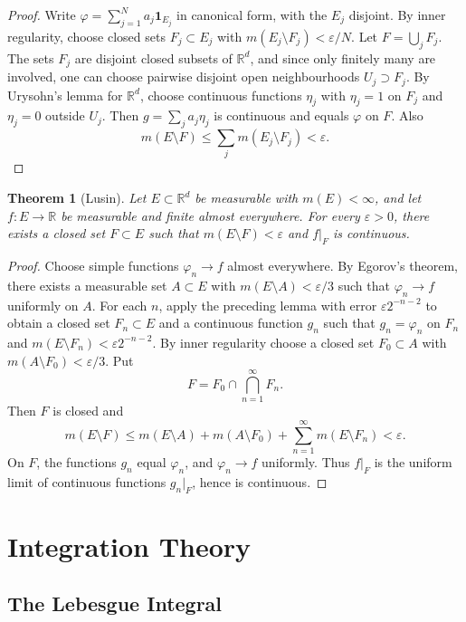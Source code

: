 \documentclass[11pt,openany]{book}
\numberwithin{equation}{chapter}
\theoremstyle{definition}
\theoremstyle{plain}
\newtheorem{theorem}[definition]{Theorem}
\theoremstyle{remark}
\newcommand{\R}{\mathbb{R}}
\newcommand{\eps}{\varepsilon}
\newcommand{\1}{\mathbf{1}}
\begin{document}
\begin{proof}
Write \(\varphi=\sum_{j=1}^N a_j\1_{E_j}\) in canonical form, with the \(E_j\) disjoint.  By inner regularity, choose closed sets \(F_j\subset E_j\) with \(m(E_j\setminus F_j)<\eps/N\).  Let \(F=\bigcup_jF_j\).  The sets \(F_j\) are disjoint closed subsets of \(\R^d\), and since only finitely many are involved, one can choose pairwise disjoint open neighbourhoods \(U_j\supset F_j\).  By Urysohn's lemma for \(\R^d\), choose continuous functions \(\eta_j\) with \(\eta_j=1\) on \(F_j\) and \(\eta_j=0\) outside \(U_j\).  Then \(g=\sum_ja_j\eta_j\) is continuous and equals \(\varphi\) on \(F\).  Also
\[
    m(E\setminus F)\le\sum_jm(E_j\setminus F_j)<\eps.
\]
\end{proof}

\begin{theorem}[Lusin]
Let \(E\subset\R^d\) be measurable with \(m(E)<\infty\), and let \(f:E\to\R\) be measurable and finite almost everywhere.  For every \(\eps>0\), there exists a closed set \(F\subset E\) such that \(m(E\setminus F)<\eps\) and \(f|_F\) is continuous.
\end{theorem}

\begin{proof}
Choose simple functions \(\varphi_n\to f\) almost everywhere.  By Egorov's theorem, there exists a measurable set \(A\subset E\) with \(m(E\setminus A)<\eps/3\) such that \(\varphi_n\to f\) uniformly on \(A\).  For each \(n\), apply the preceding lemma with error \(\eps 2^{-n-2}\) to obtain a closed set \(F_n\subset E\) and a continuous function \(g_n\) such that \(g_n=\varphi_n\) on \(F_n\) and \(m(E\setminus F_n)<\eps2^{-n-2}\).  By inner regularity choose a closed set \(F_0\subset A\) with \(m(A\setminus F_0)<\eps/3\).  Put
\[
    F=F_0\cap\bigcap_{n=1}^\infty F_n.
\]
Then \(F\) is closed and
\[
    m(E\setminus F)
    \le m(E\setminus A)+m(A\setminus F_0)+\sum_{n=1}^\infty m(E\setminus F_n)<\eps.
\]
On \(F\), the functions \(g_n\) equal \(\varphi_n\), and \(\varphi_n\to f\) uniformly.  Thus \(f|_F\) is the uniform limit of continuous functions \(g_n|_F\), hence is continuous.
\end{proof}

\chapter{Integration Theory}

\section{The Lebesgue Integral}
\end{document}
